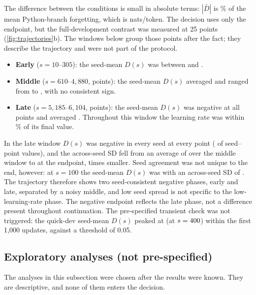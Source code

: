 \documentclass[11pt]{article}
\begin{document}
The difference between the conditions is small in absolute terms: $|\bar D|$ is \DrelPct\% of the mean
Python-branch forgetting, which is \FcodeMean{} nats/token. The decision uses only the endpoint, but the
full-development contrast was measured at 25 points (\cref{fig:trajectories}b). The windows below group those
points after the fact; they describe the trajectory and were not part of the protocol.
\begin{itemize}[leftmargin=1.4em,itemsep=2pt]
  \item \textbf{Early} ($s = 10$--$305$): the seed-mean $D(s)$ was between \earlyLo{} and \earlyHi.
  \item \textbf{Middle} ($s = 610$--$4{,}880$, \midCount{} points): the seed-mean $D(s)$ averaged \midMean{} and
        ranged from \midMin{} to \midMax, with no consistent sign.
  \item \textbf{Late} ($s = 5{,}185$--$6{,}104$, \lateCount{} points): the seed-mean $D(s)$ was negative at all
        \lateNeg{} points and averaged \lateMean. Throughout this window the learning rate was within \lateLRpct\%
        of its final value.
\end{itemize}
In the late window $D(s)$ was negative in every seed at every point (\lateNegSeedPoints{} of \lateSeedPoints{}
seed--point values), and the across-seed SD fell from an average of \midSD{} over the middle window to \finalSD{}
at the endpoint, \sdRatio{} times smaller. Seed agreement was not unique to the end, however: at $s = 100$ the
seed-mean $D(s)$ was \dipMean{} with an across-seed SD of \dipSD. The trajectory therefore shows two
seed-consistent negative phases, early and late, separated by a noisy middle, and low seed spread is not
specific to the low-learning-rate phase. The negative endpoint reflects the late phase, not a difference present
throughout continuation. The pre-specified transient check was not triggered: the quick-dev seed-mean $D(s)$ peaked at
\earlyMax{} (at $s = 400$) within the first 1{,}000 updates, against a threshold of 0.05.

\subsection{Exploratory analyses (not pre-specified)}
\label{sec:exploratory}

The analyses in this subsection were chosen after the results were known. They are descriptive, and none of
them enters the decision.
\end{document}
